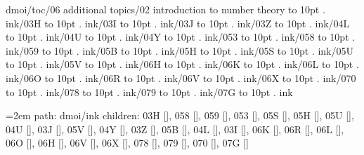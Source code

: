dmoi/toc/06 additional topics/02 introduction to number theory \leaders\hbox to 10pt {\hss.\hss}  \hfill {}
\smallskip
ink/03H \leaders\hbox to 10pt {\hss.\hss}  \hfill {}
\smallskip
ink/03I \leaders\hbox to 10pt {\hss.\hss}  \hfill {}
\smallskip
ink/03J \leaders\hbox to 10pt {\hss.\hss}  \hfill {}
\smallskip
ink/03Z \leaders\hbox to 10pt {\hss.\hss}  \hfill {}
\smallskip
ink/04L \leaders\hbox to 10pt {\hss.\hss}  \hfill {}
\smallskip
ink/04U \leaders\hbox to 10pt {\hss.\hss}  \hfill {}
\smallskip
ink/04Y \leaders\hbox to 10pt {\hss.\hss}  \hfill {}
\smallskip
ink/053 \leaders\hbox to 10pt {\hss.\hss}  \hfill {}
\smallskip
ink/058 \leaders\hbox to 10pt {\hss.\hss}  \hfill {}
\smallskip
ink/059 \leaders\hbox to 10pt {\hss.\hss}  \hfill {}
\smallskip
ink/05B \leaders\hbox to 10pt {\hss.\hss}  \hfill {}
\smallskip
ink/05H \leaders\hbox to 10pt {\hss.\hss}  \hfill {}
\smallskip
ink/05S \leaders\hbox to 10pt {\hss.\hss}  \hfill {}
\smallskip
ink/05U \leaders\hbox to 10pt {\hss.\hss}  \hfill {}
\smallskip
ink/05V \leaders\hbox to 10pt {\hss.\hss}  \hfill {}
\smallskip
ink/06H \leaders\hbox to 10pt {\hss.\hss}  \hfill {}
\smallskip
ink/06K \leaders\hbox to 10pt {\hss.\hss}  \hfill {}
\smallskip
ink/06L \leaders\hbox to 10pt {\hss.\hss}  \hfill {}
\smallskip
ink/06O \leaders\hbox to 10pt {\hss.\hss}  \hfill {}
\smallskip
ink/06R \leaders\hbox to 10pt {\hss.\hss}  \hfill {}
\smallskip
ink/06V \leaders\hbox to 10pt {\hss.\hss}  \hfill {}
\smallskip
ink/06X \leaders\hbox to 10pt {\hss.\hss}  \hfill {}
\smallskip
ink/070 \leaders\hbox to 10pt {\hss.\hss}  \hfill {}
\smallskip
ink/078 \leaders\hbox to 10pt {\hss.\hss}  \hfill {}
\smallskip
ink/079 \leaders\hbox to 10pt {\hss.\hss}  \hfill {}
\smallskip
ink/07G \leaders\hbox to 10pt {\hss.\hss}  \hfill {}
\smallskip
\vfill \break
{}
ink
\smallskip
\par\begingroup
\leftskip=2em
path: dmoi/ink
\smallskip
children: 03H [], 058 [], 059 [], 053 [], 05S [], 05H [], 05U [], 04U [], 03J [], 05V [], 04Y [], 03Z [], 05B [], 04L [], 03I [], 06K [], 06R [], 06L [], 06O [], 06H [], 06V [], 06X [], 078 [], 079 [], 070 [], 07G []
